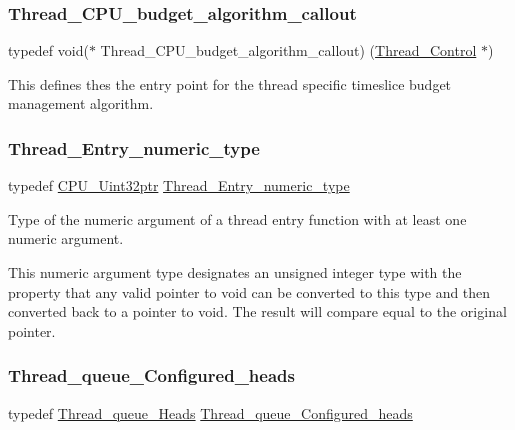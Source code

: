 \subsubsection{\texorpdfstring{Thread\_CPU\_budget\_algorithm\_callout}{Thread\_CPU\_budget\_algorithm\_callout}}
{\footnotesize\ttfamily typedef void($\ast$ Thread\+\_\+\+C\+P\+U\+\_\+budget\+\_\+algorithm\+\_\+callout) (\mbox{\hyperlink{struct__Thread__Control}{Thread\+\_\+\+Control}} $\ast$)}

This defines thes the entry point for the thread specific timeslice budget management algorithm. \mbox{\label{group__RTEMSScoreThread_gab56e437830bb9a4af5b27ac7ec503b6a}} 
\subsubsection{\texorpdfstring{Thread\_Entry\_numeric\_type}{Thread\_Entry\_numeric\_type}}
{\footnotesize\ttfamily typedef \mbox{\hyperlink{group__RTEMSScoreCPUARM_ga9fca17f81f850e128fcc8ed5b87ff2ab}{C\+P\+U\+\_\+\+Uint32ptr}} \mbox{\hyperlink{group__RTEMSScoreThread_gab56e437830bb9a4af5b27ac7ec503b6a}{Thread\+\_\+\+Entry\+\_\+numeric\+\_\+type}}}



Type of the numeric argument of a thread entry function with at least one numeric argument. 

This numeric argument type designates an unsigned integer type with the property that any valid pointer to void can be converted to this type and then converted back to a pointer to void. The result will compare equal to the original pointer. \mbox{\label{group__RTEMSScoreThread_gac2edd6c043930e8159685c0cb2e19ca7}} 
\subsubsection{\texorpdfstring{Thread\_queue\_Configured\_heads}{Thread\_queue\_Configured\_heads}}
{\footnotesize\ttfamily typedef \mbox{\hyperlink{group__RTEMSScoreThreadQueue_gaebac32033b009cc8f606a90bd389f8e9}{Thread\+\_\+queue\+\_\+\+Heads}} \mbox{\hyperlink{group__RTEMSScoreThread_gac2edd6c043930e8159685c0cb2e19ca7}{Thread\+\_\+queue\+\_\+\+Configured\+\_\+heads}}}



